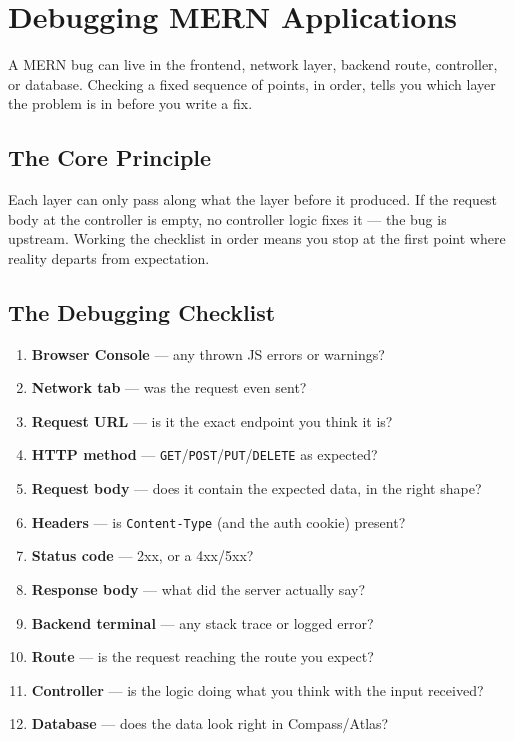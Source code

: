 \chapter{Debugging MERN Applications}

A MERN bug can live in the frontend, network layer, backend route,
controller, or database. Checking a fixed sequence of points, in order,
tells you which layer the problem is in before you write a fix.

\section{The Core Principle}

Each layer can only pass along what the layer before it produced. If the
request body at the controller is empty, no controller logic fixes it ---
the bug is upstream. Working the checklist in order means you stop at the
first point where reality departs from expectation.

\section{The Debugging Checklist}

\begin{enumerate}
\item \textbf{Browser Console} --- any thrown JS errors or warnings?
\item \textbf{Network tab} --- was the request even sent?
\item \textbf{Request URL} --- is it the exact endpoint you think it is?
\item \textbf{HTTP method} --- \texttt{GET}/\texttt{POST}/\texttt{PUT}/\texttt{DELETE} as expected?
\item \textbf{Request body} --- does it contain the expected data, in the right shape?
\item \textbf{Headers} --- is \texttt{Content-Type} (and the auth cookie) present?
\item \textbf{Status code} --- 2xx, or a 4xx/5xx?
\item \textbf{Response body} --- what did the server actually say?
\item \textbf{Backend terminal} --- any stack trace or logged error?
\item \textbf{Route} --- is the request reaching the route you expect?
\item \textbf{Controller} --- is the logic doing what you think with the input received?
\item \textbf{Database} --- does the data look right in Compass/Atlas?
\end{enumerate}

